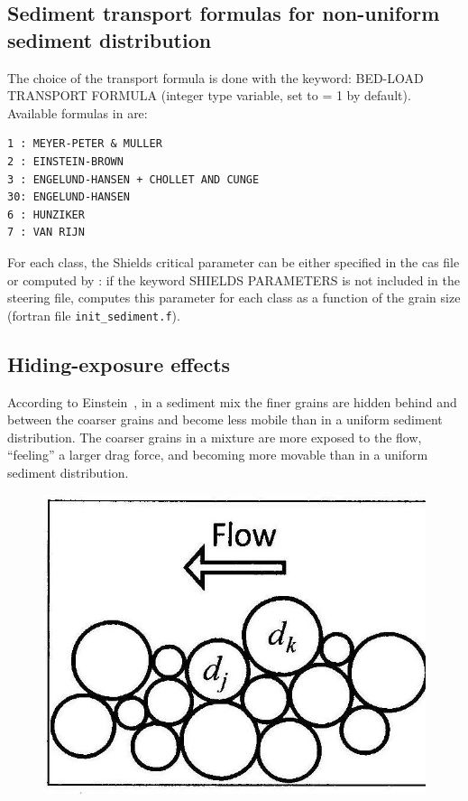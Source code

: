 \subsection{Sediment transport formulas for non-uniform sediment distribution}
The choice of the transport formula is done with the keyword: {\ttfamily BED-LOAD TRANSPORT FORMULA} (integer type variable, set to {\ttfamily = 1} by default). Available formulas in \sisyphe{} are:
\begin{lstlisting}[frame=trBL]   
1 : MEYER-PETER & MULLER
2 : EINSTEIN-BROWN 
3 : ENGELUND-HANSEN + CHOLLET AND CUNGE 
30: ENGELUND-HANSEN 
6 : HUNZIKER 
7 : VAN RIJN
\end{lstlisting}
For each class, the Shields critical parameter can be either specified in the cas file or computed by \sisyphe{}: if the keyword {\ttfamily SHIELDS PARAMETERS} is not included in the steering file, \sisyphe{} computes this parameter for each class as a function of the grain size (fortran file \texttt{init\_sediment.f}).

\subsection{Hiding-exposure effects}
According to Einstein~\cite{Einstein}, in a sediment mix the finer grains are hidden behind and between the coarser grains and become less mobile than in a uniform sediment distribution. The coarser grains in a mixture are more exposed to the flow, ``feeling'' a larger drag force, and becoming more movable than in a uniform sediment distribution.

\begin{figure}[H]%
\begin{center}
\includegraphics[scale=1.0]{./graphics/Fig_2_6_a.jpg}
\end{center}
\end{figure}

